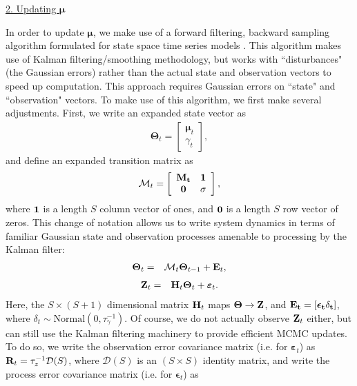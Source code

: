 \documentclass[12pt,fleqn]{article}
\begin{document}
\begin{flushleft}
\underline{2. Updating $\boldsymbol{\mu}$}

In order to update $\boldsymbol{\mu}$, we make use of a forward filtering, backward sampling algorithm formulated for state space time series models \citep{DurbinKoopman2002}.  This algorithm
makes use of Kalman filtering/smoothing methodology, but works with ``disturbances" (the Gaussian errors) rather than the actual state and observation vectors to speed up computation.  This approach requires Gaussian errors on ``state" and ``observation" vectors.  To make use of this algorithm, we first make several adjustments.  First, we write an expanded state vector as
\begin{eqnarray*}
  \boldsymbol{\Theta}_t = \left[  \begin{array}{c} \boldsymbol{\mu}_t \\ \gamma_t \end{array} \right],
\end{eqnarray*}
and define an expanded transition matrix as
\begin{eqnarray*}
  \mathcal{M}_t = \left[  \begin{array}{cc} \bf{M}_t & {\bf 1} \\ {\bf 0} & \sigma \end{array} \right],
\end{eqnarray*}
where ${\bf 1}$ is a length $S$ column vector of ones, and ${\bf 0}$ is a length $S$ row vector of zeros.  This change of notation allows us to write system dynamics in terms of familiar Gaussian state and observation processes amenable to processing by the Kalman filter:
\begin{eqnarray}
  \boldsymbol{\Theta}_t & = & \mathcal{M}_t \boldsymbol{\Theta}_{t-1} + {\bf E}_t,
  \label{eq:state-eq}
\end{eqnarray}
\begin{eqnarray}
  {\bf Z}_t & = & {\bf H}_t \boldsymbol{\Theta}_t + \boldsymbol{\varepsilon}_t.
   \label{eq:obs-eq}
\end{eqnarray}
Here, the $S \times (S+1)$ dimensional matrix ${\bf H}_t$ maps $\boldsymbol{\Theta} \rightarrow {\bf Z}$, and $\bf{E}_t = [\boldsymbol{\epsilon}_t \delta_t]$,
where $\delta_t \sim \textrm{Normal}(0,\tau_\gamma^{-1})$.
Of course, we do not actually observe ${\bf Z}_t$ either, but can still use the Kalman filtering machinery to provide efficient MCMC updates.  To do so, we write the observation error covariance matrix (i.e. for $\boldsymbol{\varepsilon}_t$) as ${\bf R}_t = \tau_z^{-1} \mathcal{D}(S)$, where $\mathcal{D}(S)$ is an $(S \times S)$ identity matrix, and write the process error covariance matrix (i.e. for $\boldsymbol{\epsilon}_t$) as

\end{flushleft}
\end{document}
